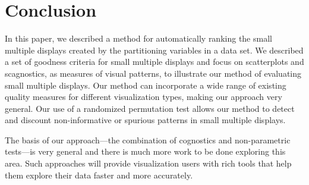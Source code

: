 \section{Conclusion}

In this paper, we described a method for automatically ranking the small multiple displays created by the partitioning variables in a data set. We described a set of goodness criteria for small multiple displays and focus on scatterplots and scagnostics, as measures of visual patterns, to illustrate our method of evaluating small multiple displays. Our method can incorporate a wide range of existing quality measures for different visualization types, making our approach very general. Our use of a randomized permutation test allows our method to detect and discount non-informative or spurious patterns in small multiple displays.

The basis of our approach---the combination of cognostics and non-parametric tests---is very general and there is much more work to be done exploring this area. Such approaches will provide visualization users with rich tools that help them explore their data faster and more accurately.
